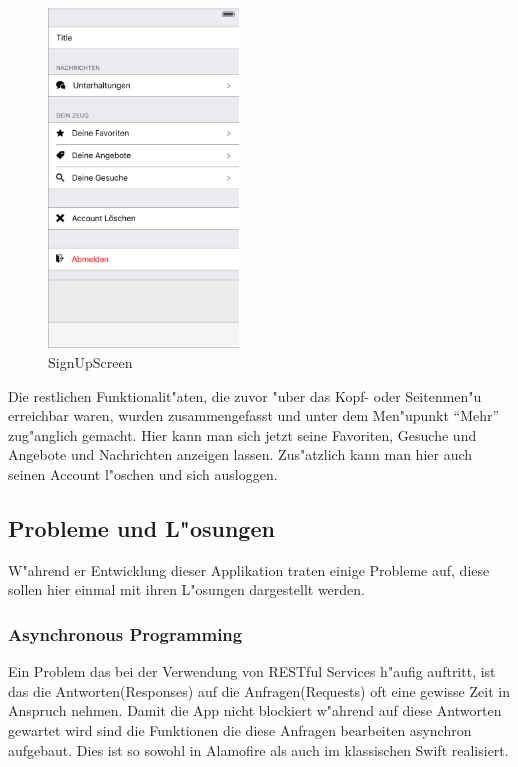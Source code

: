 \begin{figure}[H]
\begin{center}
\includegraphics[width=0.45\textwidth]{./Bilder/iosMenu.png}
\caption{SignUpScreen}
\label{fig:ioslogin}
\end{center}
\end{figure}

Die restlichen Funktionalit"aten, die zuvor "uber das Kopf- oder Seitenmen"u  erreichbar waren, wurden zusammengefasst und unter dem Men"upunkt \enquote{Mehr} zug"anglich gemacht.
Hier kann man sich jetzt seine Favoriten, Gesuche und Angebote und Nachrichten anzeigen lassen. Zus"atzlich kann man hier auch seinen Account l"oschen und sich ausloggen.

\subsection{Probleme und L"osungen}

W"ahrend er Entwicklung dieser Applikation traten einige Probleme auf, diese sollen hier einmal mit ihren L"osungen dargestellt werden. 

\subsubsection{Asynchronous Programming}

Ein Problem das bei der Verwendung von RESTful Services h"aufig auftritt, ist das die Antworten(Responses) auf die Anfragen(Requests) oft eine gewisse Zeit in Anspruch nehmen. Damit die App nicht blockiert w"ahrend auf diese Antworten gewartet wird sind die Funktionen die diese Anfragen bearbeiten asynchron aufgebaut. Dies ist so sowohl in Alamofire als auch im klassischen Swift realisiert. 

